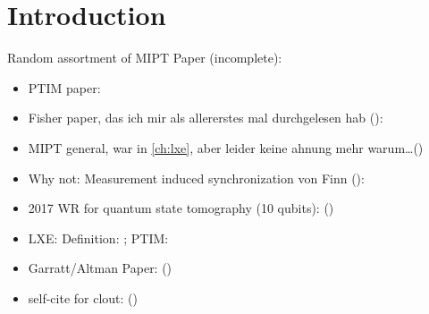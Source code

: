 \chapter{Introduction}
\label{ch:intro}

Random assortment of MIPT Paper (incomplete):
\begin{itemize}
  \item PTIM paper: 
    \cite{langEntanglementTransitionProjective2020}
  \item Fisher paper, das ich mir als allererstes mal durchgelesen hab
    ():
    \cite{liMeasurementdrivenEntanglementTransition2019}
  \item MIPT general, war in \cref{ch:lxe}, aber leider keine ahnung mehr
    warum\ldots () \cite{baoTheoryPhaseTransition2020}
  \item Why not: Measurement induced synchronization von Finn
    ():
    \cite{schmolkeMeasurementinducedQuantumSynchronization2023}
  \item 2017 WR for quantum state tomography (10 qubits):
    ()
    \cite{song10QubitEntanglementParallel2017}
  \item LXE: Definition: \cite{liCrossEntropyBenchmark2023}; PTIM:
    \cite{tikhanovskayaUniversalityCrossEntropy2023}
  \item Garratt/Altman Paper:
    () \cite{garrattProbingPostmeasurementEntanglement2023}
  \item self-cite for clout:
    ()
    \cite{schmolkeBoostingInformationTransfer2024}
\end{itemize}

\lipsum[0-1]
